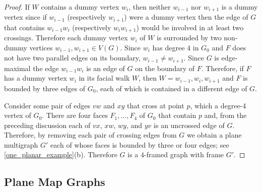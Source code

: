 \documentclass{patmorin}
\theoremstyle{plain}
\theoremstyle{definition}
\newcommand{\note}[2]{\noindent{\color{red}[#1:~#2]}}
\DeclareMathOperator{\dist}{dist}
\renewcommand{\le}{\leqslant}
\begin{document}
\begin{proof}
If $W$ contains a dummy vertex $w_i$, then neither $w_{i-1}$ nor $w_{i+1}$ is a dummy vertex since if $w_{i-1}$ (respectively $w_{i+1}$) were a dummy vertex then the edge of $G$ that contains $w_{i-1}w_i$ (respectively $w_iw_{i+1}$) would be involved in at least two crossings.  Therefore each dummy vertex $w_i$ of $W$ is surrounded by two non-dummy vertices $w_{i-1},w_{i+1}\in V(G)$.  Since $w_i$ has degree $4$ in $G_0$ and $F$ does not have two parallel edges on its boundary, $w_{i-1}\neq w_{i+1}$.  Since $G$ is edge-maximal the edge $w_{i-1}w_i$ is an edge of $G$ on the boundary of $F$.  Therefore, if $F$ has a dummy vertex $w_i$ in its facial walk $W$, then $W=w_{i-1},w_i,w_{i+1}$ and $F$ is bounded by three edges of $G_0$, each of which is contained in a different edge of $G$.


Consider some pair of edges $vw$ and $xy$ that cross at point $p$, which a degree-4 vertex of $G_0$.  There are four faces $F_1,\ldots,F_4$ of $G_0$ that contain $p$ and, from the preceding discussion each of $vx$, $xw$, $wy$, and $yv$ is an uncrossed edge of $G$.  Therefore, by removing each pair of crossing edges from $G$ we obtain a plane multigraph $G'$ each of whose faces is bounded by three or four edges; see \cref{one_planar_example}(b).  Therefore $G$ is a $4$-framed graph with frame $G'$.
\end{proof}

\subsection{Plane Map Graphs}

\end{document}
